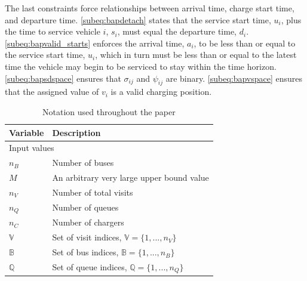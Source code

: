 \documentclass[ee,msthesis]{usuthesis}
\begin{document}
The last constraints force relationships between arrival time, charge start time, and departure time.
\autoref{subeq:bapdetach} states that the service start time, \(u_i\), plus the time to service vehicle \(i\), \(s_i\), must
equal the departure time, \(d_i\). \autoref{subeq:bapvalid_starts} enforces the arrival time, \(a_i\), to be less than or
equal to the service start time, \(u_i\), which in turn must be less than or equal to the latest time the vehicle may
begin to be serviced to stay within the time horizon. \autoref{subeq:bapsdspace} ensures that \(\sigma_{ij}\) and
\(\psi_{ij}\) are binary. \autoref{subeq:bapvspace} ensures that the assigned value of \(v_i\) is a valid charging position.
\begin{table}[!htpb]
  \caption{Notation used throughout the paper}
  \label{tab:variables}
  \centering
  \begin{tabularx}{\textwidth}{l l}
    \toprule
    \textbf{Variable} & \textbf{Description}                                                                               \\
    \toprule
    \multicolumn{2}{l}{Input values}                                                                                       \\
    $n_B$        & Number of buses                                                                                         \\
    $M$          & An arbitrary very large upper bound value                                                               \\
    $n_V$        & Number of total visits                                                                                  \\
    $n_Q$        & Number of queues                                                                                        \\
    $n_C$ 	 & Number of chargers                                                                                      \\
    $\mathbb{V}$ & Set of visit indices, $\mathbb{V} = \{1, ..., n_V\}$                                                    \\
    $\mathbb{B}$ & Set of bus indices, $\mathbb{B} = \{1, ..., n_B\}$                                                      \\
    $\mathbb{Q}$          & Set of queue indices, $\mathbb{Q} = \{1, ..., n_Q\}$                                                             \\

\end{tabularx}
\end{table}
\end{document}
